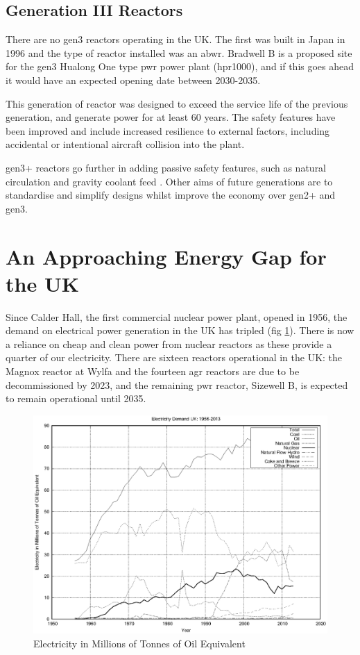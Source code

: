 \subsection{Generation III Reactors}

There are no \acrshort{gen3} reactors operating in the UK.  The first was built in Japan in 1996 and the type of reactor installed was an \acrfull{abwr}.  Bradwell B is a proposed site for the \acrshort{gen3} Hualong One type \acrshort{pwr} power plant (\acrshort{hpr}1000), and if this goes ahead it would have an expected opening date between 2030-2035.   

This generation of reactor was designed to exceed the service life of the previous generation, and generate power for at least 60 years.  The safety features have been improved and include increased resilience to external factors, including accidental or intentional aircraft collision into the plant\cite{genIIIimprovements}.

\acrshort{gen3+} reactors go further in adding passive safety features, such as natural circulation and gravity coolant feed \cite{geniiiplussafety}.  Other aims of future generations are to standardise and simplify designs whilst improve the economy over \acrshort{gen2+} and \acrshort{gen3}. 


\section{An Approaching Energy Gap for the UK}

Since Calder Hall, the first commercial nuclear power plant, opened in 1956, the demand on electrical power generation in the UK has tripled (fig \ref{fig:electricityusagesuk}).  There is now a reliance on cheap and clean power from nuclear reactors as these provide a quarter of our electricity.  There are sixteen reactors operational in the UK:  the Magnox reactor at Wylfa and the fourteen \acrshort{agr} reactors are due to be decommissioned by 2023\cite{gen4}, and the remaining \acrshort{pwr} reactor, Sizewell B, is expected to remain operational until 2035\cite{gen4}.

\begin{figure}[tbp]
  \begin{center}
    \includegraphics[width=.7\linewidth]{chapters/introduction/plots/elec_demand/elec_demand.eps}
    \caption{Electricity in Millions of Tonnes of Oil Equivalent}
    \label{fig:electricityusagesuk}
  \end{center}
\end{figure}

